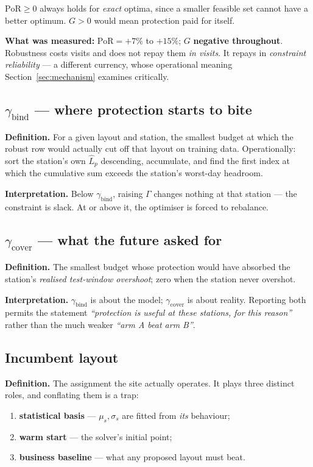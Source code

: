 \documentclass[11pt,a4paper]{article}
\newcommand{\gbind}{\gamma_{\mathrm{bind}}}
\newcommand{\gcover}{\gamma_{\mathrm{cover}}}
\newcommand{\PoR}{\mathrm{PoR}}
\begin{document}
$\PoR \ge 0$ always holds for \emph{exact} optima, since a smaller feasible set
cannot have a better optimum. $G>0$ would mean protection paid for itself.

\textbf{What was measured:} $\PoR = +7\%$ to $+15\%$; $G$ \textbf{negative
throughout}. Robustness costs visits and does not repay them \emph{in visits}.
It repays in \emph{constraint reliability} --- a different currency, whose
operational meaning Section~\ref{sec:mechanism} examines critically.

\subsection{\texorpdfstring{$\gbind$}{gamma-bind} --- where protection starts to bite}

\textbf{Definition.} For a given layout and station, the smallest budget at
which the robust row would actually cut off that layout on training data.
Operationally: sort the station's own $\hat L_p$ descending, accumulate, and
find the first index at which the cumulative sum exceeds the station's
worst-day headroom.

\textbf{Interpretation.} Below $\gbind$, raising $\Gamma$ changes nothing at
that station --- the constraint is slack. At or above it, the optimiser is
forced to rebalance.

\subsection{\texorpdfstring{$\gcover$}{gamma-cover} --- what the future asked for}

\textbf{Definition.} The smallest budget whose protection would have absorbed
the station's \emph{realised test-window overshoot}; zero when the station
never overshot.

\textbf{Interpretation.} $\gbind$ is about the model; $\gcover$ is about
reality. Reporting both permits the statement \emph{``protection is useful at
these stations, for this reason''} rather than the much weaker \emph{``arm A
beat arm B''}.

\subsection{Incumbent layout}

\textbf{Definition.} The assignment the site actually operates. It plays three
distinct roles, and conflating them is a trap:

\begin{enumerate}
  \item \textbf{statistical basis} --- $\mu_s,\sigma_s$ are fitted from \emph{its} behaviour;
  \item \textbf{warm start} --- the solver's initial point;
  \item \textbf{business baseline} --- what any proposed layout must beat.
\end{enumerate}
\end{document}
